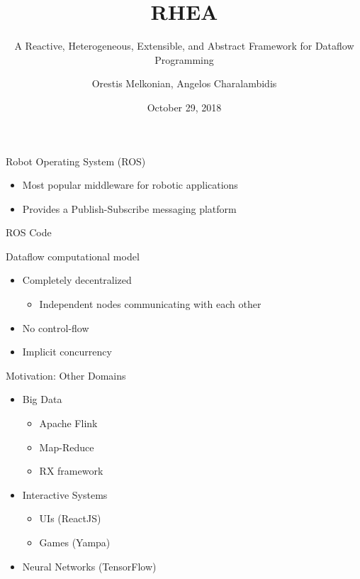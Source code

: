 \documentclass{beamer}
\title{RHEA}
\subtitle{A Reactive, Heterogeneous, Extensible, and Abstract Framework for Dataflow Programming}
\author{\alert{Orestis Melkonian}, Angelos Charalambidis}
\date{October 29, 2018}
\institute{Utrecht University, National Center for Scientific Research "Demokritos"}
\begin{document}
  
	\maketitle
	
	\begin{frame}{Robot Operating System (ROS)}
    \begin{itemize}
		\item Most popular middleware for robotic applications
	  \item Provides a Publish-Subscribe messaging platform \vspace{1cm}
	  \end{itemize}
	\end{frame}
	
	\begin{frame}{ROS Code}
	\end{frame}

	\begin{frame}{Dataflow computational model}
		\begin{itemize}
		\item Completely decentralized
		  \begin{itemize}
		  \item Independent nodes communicating with each other
		  \end{itemize}
		\item No control-flow
		\item Implicit concurrency
		\end{itemize}
	\end{frame}
	
	\begin{frame}{Motivation: Other Domains}
	  \begin{itemize}
	  \item Big Data
	    \begin{itemize}
	    \item Apache Flink
	    \item Map-Reduce
	    \item RX framework
	    \end{itemize}
    \item Interactive Systems
      \begin{itemize}
      \item UIs (ReactJS)
      \item Games (Yampa)
      \end{itemize}
	  \item Neural Networks (TensorFlow)
	  \end{itemize}
	\end{frame}
	
\end{document}
